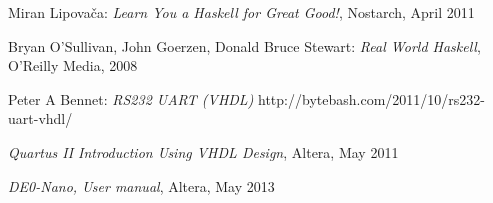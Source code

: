 \begin{thebibliography}{99}

 Miran Lipovača:
\emph{Learn You a Haskell for Great Good!},
Nostarch, April 2011

 Bryan O'Sullivan, John Goerzen, Donald Bruce Stewart:
\emph{Real World Haskell},
O'Reilly Media, 2008

Peter A Bennet:
\emph{RS232 UART (VHDL)}
http://bytebash.com/2011/10/rs232-uart-vhdl/


\emph{Quartus II Introduction Using VHDL Design},
Altera, May 2011

\emph{DE0-Nano, User manual},
Altera, May 2013

\end{thebibliography}

